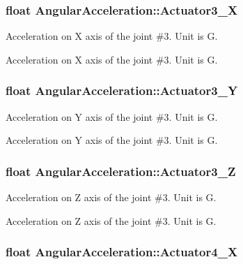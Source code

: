 \subsubsection[{\texorpdfstring{Actuator3\+\_\+X}{Actuator3_X}}]{\setlength{\rightskip}{0pt plus 5cm}float Angular\+Acceleration\+::\+Actuator3\+\_\+X}\hypertarget{structAngularAcceleration_a687fb8bac7a0b529fbd07e7c5c17c281}{}\label{structAngularAcceleration_a687fb8bac7a0b529fbd07e7c5c17c281}


Acceleration on X axis of the joint \#3. Unit is G. 

Acceleration on X axis of the joint \#3. Unit is G. 
\subsubsection[{\texorpdfstring{Actuator3\+\_\+Y}{Actuator3_Y}}]{\setlength{\rightskip}{0pt plus 5cm}float Angular\+Acceleration\+::\+Actuator3\+\_\+Y}\hypertarget{structAngularAcceleration_a8b372df5c994266783918e9fc7260cb3}{}\label{structAngularAcceleration_a8b372df5c994266783918e9fc7260cb3}


Acceleration on Y axis of the joint \#3. Unit is G. 

Acceleration on Y axis of the joint \#3. Unit is G. 
\subsubsection[{\texorpdfstring{Actuator3\+\_\+Z}{Actuator3_Z}}]{\setlength{\rightskip}{0pt plus 5cm}float Angular\+Acceleration\+::\+Actuator3\+\_\+Z}\hypertarget{structAngularAcceleration_a178c35c220a0d0ecc8e0d228c10dfac0}{}\label{structAngularAcceleration_a178c35c220a0d0ecc8e0d228c10dfac0}


Acceleration on Z axis of the joint \#3. Unit is G. 

Acceleration on Z axis of the joint \#3. Unit is G. 
\subsubsection[{\texorpdfstring{Actuator4\+\_\+X}{Actuator4_X}}]{\setlength{\rightskip}{0pt plus 5cm}float Angular\+Acceleration\+::\+Actuator4\+\_\+X}\hypertarget{structAngularAcceleration_a5ac59b5d6354f56a574849b3058aff8a}{}\label{structAngularAcceleration_a5ac59b5d6354f56a574849b3058aff8a}


